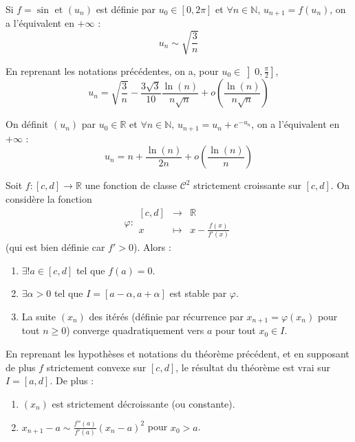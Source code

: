   \begin{example}
    Si $f = \sin$ et $(u_n)$ est définie par $u_0 \in [0, 2\pi]$ et $\forall n \in \mathbb{N}, \, u_{n+1} = f(u_n)$, on a l'équivalent en $+\infty$ :
    \[ u_n \sim \sqrt{\frac{3}{n}} \]
  \end{example}


  \begin{proposition}
    En reprenant les notations précédentes, on a, pour $u_0 \in \left] 0, \frac{\pi}{2} \right]$,
    \[ u_n = \sqrt{\frac{3}{n}} - \frac{3 \sqrt{3}}{10} \frac{\ln(n)}{n\sqrt{n}} + o\left( \frac{\ln(n)}{n\sqrt{n}} \right) \]
  \end{proposition}


  \begin{example}
    On définit $(u_n)$ par $u_0 \in \mathbb{R}$ et $\forall n \in \mathbb{N}, \, u_{n+1} = u_n + e^{-u_n}$, on a l'équivalent en $+\infty$ :
    \[ u_n = n + \frac{\ln(n)}{2n} + o\left( \frac{\ln(n)}{n} \right) \]
  \end{example}


  \begin{theorem}
    Soit $f : [c, d] \rightarrow \mathbb{R}$ une fonction de classe $\mathcal{C}^2$ strictement croissante sur $[c, d]$. On considère la fonction
    \[ \varphi :
    \begin{array}{ccc}
      [c, d] &\rightarrow& \mathbb{R} \\
      x &\mapsto& x - \frac{f(x)}{f'(x)}
    \end{array}
    \]
    (qui est bien définie car $f' > 0$). Alors :
    \begin{enumerate}[label=(\roman*)]
      \item $\exists! a \in [c, d]$ tel que $f(a) = 0$.
      \item $\exists \alpha > 0$ tel que $I = [a - \alpha, a + \alpha]$ est stable par $\varphi$.
      \item La suite $(x_n)$ des itérés (définie par récurrence par $x_{n+1} = \varphi(x_n)$ pour tout $n \geq 0$) converge quadratiquement vers $a$ pour tout $x_0 \in I$.
    \end{enumerate}
  \end{theorem}

  \begin{corollary}
    En reprenant les hypothèses et notations du théorème précédent, et en supposant de plus $f$ strictement convexe sur $[c, d]$, le résultat du théorème est vrai sur $I = [a, d]$. De plus :
    \begin{enumerate}[label=(\roman*)]
      \item $(x_n)$ est strictement décroissante (ou constante).
      \item $x_{n+1} - a \sim \frac{f''(a)}{f'(a)} (x_n - a)^2$ pour $x_0 > a$.
    \end{enumerate}
  \end{corollary}

